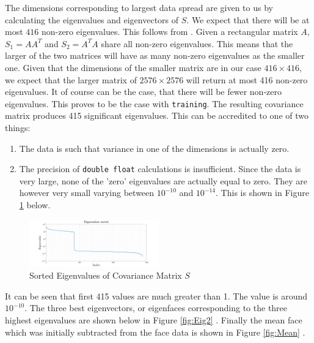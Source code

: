 \documentclass[10pt,twocolumn,letterpaper]{article}
\begin{document}
The dimensions corresponding to largest data spread are given to us by calculating the eigenvalues and eigenvectors of $S$. We expect that there will be at most $416$ non-zero eigenvalues. This follows from \cite{Data Mining}. Given a rectangular matrix $A$, $S_1 = AA^T$ and $S_2 = A^TA$ share all non-zero eigenvalues. This means that the larger of the two matrices will have as many non-zero eigenvalues as the smaller one. Given that the dimensions of the smaller matrix are in our case $416 \times 416$, we expect that the larger matrix of $2576 \times 2576$ will return at most 416 non-zero eigenvalues. It of course can be the case, that there will be fewer non-zero eigenvalues. This proves to be the case with {\tt\small training}. The resulting covariance matrix produces 415 significant eigenvalues. This can be accredited to one of two things:

\begin{enumerate}
\item The data is such that variance in one of the dimensions is actually zero.
\item The precision of {\tt\small double float} calculations is insufficient. Since the data is very large, none of the 'zero' eigenvalues are actually equal to zero. They are however very small varying between $10^{-10}$ and $10^{-14}$. This is shown in Figure \ref{fig:Eig1} below.
\end{enumerate}

\begin{figure}[H]

\centering
\includegraphics[width=0.5\textwidth]{../results/Q1A_PCA_Eigenvalues}

  \caption{Sorted Eigenvalues of Covariance Matrix $S$ \label{fig:Eig1}}

\end{figure}

It can be seen that first 415 values are much greater than 1. The  value is around $10^{-10}$. The three best eigenvectors, or eigenfaces corresponding to the three highest eigenvalues are shown below in Figure \ref{fig:Eig2} . Finally the mean face which was initially subtracted from the face data is shown in Figure \ref{fig:Mean} .
\end{document}
